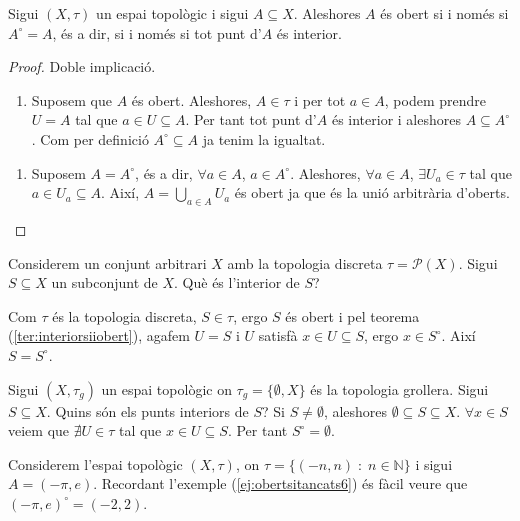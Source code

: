 \documentclass[../main.tex]{subfiles}
\begin{document}
\begin{ter}
\label{ter:interiorsiiobert} Sigui $(X,\tau)$ un espai topològic i sigui $A\subseteq X$. Aleshores $A$ és obert si i només si $A^\circ = A$, és a dir, si i només si tot punt d'$A$ és interior.
\end{ter}
\begin{proof}
Doble implicació.
\begin{enumerate}[($\Rightarrow$)]
    \item Suposem que $A$ és obert. Aleshores, $A\in\tau$ i per tot $a\in A$, podem prendre $U = A$ tal que $a\in U\subseteq A$. Per tant tot punt d'$A$ és interior i aleshores $A\subseteq A^\circ$. Com per definició $A^\circ\subseteq A$ ja tenim la igualtat.
\end{enumerate}
\begin{enumerate}[($\Leftarrow$)]
    \item Suposem $A = A^\circ$, és a dir, $\forall a\in A$, $a\in A^\circ$. Aleshores, $\forall a\in A$, $\exists U_a\in\tau$ tal que $a\in U_a\subseteq A$. Així, $A = \bigcup_{a\in A}U_a$ és obert ja que és la unió arbitrària d'oberts.
\end{enumerate}
\end{proof}

\begin{ej}
\label{ej:interior3} Considerem un conjunt arbitrari $X$ amb la topologia discreta $\tau = \mathscr{P}(X)$. Sigui $S\subseteq X$ un subconjunt de $X$. Què és l'interior de $S$?

Com $\tau$ és la topologia discreta, $S\in \tau$, ergo $S$ és obert i pel teorema (\ref{ter:interiorsiiobert}), agafem $U=S$ i $U$ satisfà $x\in U\subseteq S$, ergo $x\in S^\circ$. Així $S=S^\circ$.
\end{ej}

\begin{ej}
\label{ej:interior4} Sigui $(X,\tau_g)$ un espai topològic on $\tau_g = \{\emptyset, X\}$ és la topologia grollera. Sigui $S\subseteq X$. Quins són els punts interiors de $S$? Si $S\not=\emptyset$, aleshores $\emptyset\subseteq S\subseteq X$. $\forall x\in S$ veiem que $\nexists U\in \tau$ tal que $x\in U\subseteq S$. Per tant $S^\circ = \emptyset$.
\end{ej}

\begin{ej}
\label{ej:interior5} Considerem l'espai topològic $(X,\tau)$, on $\tau = \{(-n,n)\;:\;n\in\mathbb{N}\}$ i sigui $A = (-\pi,e)$. Recordant l'exemple (\ref{ej:obertsitancats6}) és fàcil veure que $(-\pi,e)^\circ = (-2,2)$.
\end{ej}
\end{document}
